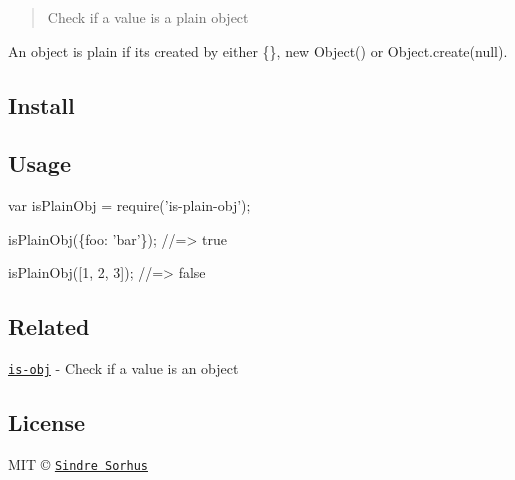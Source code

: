 \begin{quote}
Check if a value is a plain object \end{quote}


An object is plain if it\textquotesingle{}s created by either {\ttfamily \{\}}, {\ttfamily new Object()} or {\ttfamily Object.\+create(null)}.

\subsection*{Install}




\subsection*{Usage}


\begin{DoxyCode}
var isPlainObj = require('is-plain-obj');

isPlainObj(\{foo: 'bar'\});
//=> true

isPlainObj([1, 2, 3]);
//=> false
\end{DoxyCode}


\subsection*{Related}


\begin{DoxyItemize}
\item \href{https://github.com/sindresorhus/is-obj}{\tt is-\/obj} -\/ Check if a value is an object
\end{DoxyItemize}

\subsection*{License}

M\+IT © \href{http://sindresorhus.com}{\tt Sindre Sorhus} 